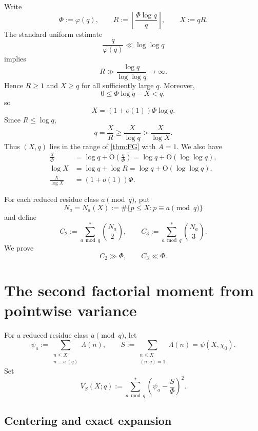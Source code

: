 \documentclass[11pt]{article}
\theoremstyle{definition}
\theoremstyle{remark}
\newcommand{\ph}{\varphi}
\newcommand{\1}{\mathbf 1}
\newcommand{\OO}{\mathrm O}
\begin{document}
Write
\[
 \Phi:=\ph(q),\qquad
 R:=\left\lfloor\frac{\Phi\log q}{q}\right\rfloor,
 \qquad X:=qR.
\]
The standard uniform estimate
\[
 \frac{q}{\ph(q)}\ll\log\log q
\]
implies
\[
 R\gg\frac{\log q}{\log\log q}\longrightarrow\infty.
\]
Hence $R\ge1$ and $X\ge q$ for all sufficiently large $q$.
Moreover,
\begin{equation}\label{eq:floor}
 0\le\Phi\log q-X<q,
\end{equation}
so
\begin{equation}\label{eq:Xasymp}
 X=(1+o(1))\Phi\log q.
\end{equation}
Since $R\le\log q$,
\begin{equation}\label{eq:FG-range}
 q=\frac XR\ge\frac{X}{\log q}>\frac{X}{\log X}.
\end{equation}
Thus $(X,q)$ lies in the range of \cref{thm:FG} with $A=1$.
We also have
\begin{align}
 \frac X\Phi
 &=\log q+\OO\!\left(\frac q\Phi\right)
  =\log q+\OO(\log\log q),\label{eq:Xoverphi}\\
 \log X&=\log q+\log R=\log q+\OO(\log\log q),\label{eq:logX}\\
 \frac{X}{\log X}&=(1+o(1))\Phi.\label{eq:XlogX}
\end{align}

For each reduced residue class $a\pmod q$, put
\[
 N_a=N_a(X):=\#\{p\le X:p\equiv a\pmod q\}
\]
and define
\[
 C_2:=\sum_{a\bmod q}^{*}\binom{N_a}{2},
 \qquad
 C_3:=\sum_{a\bmod q}^{*}\binom{N_a}{3}.
\]
We prove
\begin{equation}\label{eq:moments-goal}
 C_2\gg\Phi,\qquad C_3\ll\Phi.
\end{equation}

\section{The second factorial moment from pointwise variance}\label{sec:pair}

For a reduced residue class $a\pmod q$, let
\[
 \psi_a:=\sum_{\substack{n\le X\\n\equiv a\ (q)}}\Lambda(n),
 \qquad
 S:=\sum_{\substack{n\le X\\(n,q)=1}}\Lambda(n)=\psi(X,\chi_0).
\]
Set
\[
 V_S(X;q):=\sum_{a\bmod q}^{*}
 \left(\psi_a-\frac S\Phi\right)^2.
\]

\subsection{Centering and exact expansion}
\end{document}
